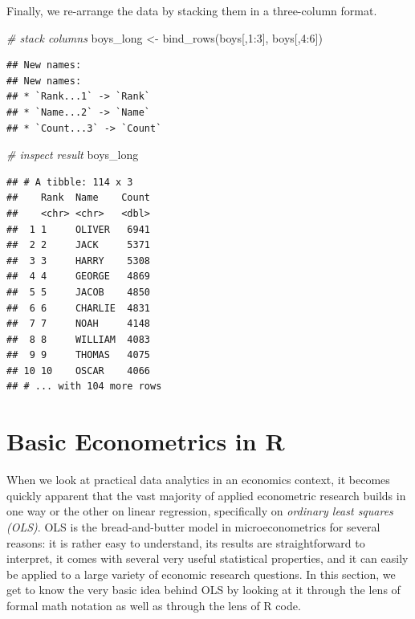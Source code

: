 \documentclass[
  12pt,
]{style/krantz}
\newenvironment{Shaded}{\begin{snugshade}}{\end{snugshade}}
\newcommand{\CommentTok}[1]{\textcolor[rgb]{0.56,0.35,0.01}{\textit{#1}}}
\newcommand{\DecValTok}[1]{\textcolor[rgb]{0.00,0.00,0.81}{#1}}
\newcommand{\FunctionTok}[1]{\textcolor[rgb]{0.00,0.00,0.00}{#1}}
\newcommand{\NormalTok}[1]{#1}
\newcommand{\OtherTok}[1]{\textcolor[rgb]{0.56,0.35,0.01}{#1}}
\newcommand{\SpecialCharTok}[1]{\textcolor[rgb]{0.00,0.00,0.00}{#1}}
\begin{document}
Finally, we re-arrange the data by stacking them in a three-column format.

\begin{Shaded}
\begin{Highlighting}[]
\CommentTok{\# stack columns}
\NormalTok{boys\_long }\OtherTok{\textless{}{-}} \FunctionTok{bind\_rows}\NormalTok{(boys[,}\DecValTok{1}\SpecialCharTok{:}\DecValTok{3}\NormalTok{], boys[,}\DecValTok{4}\SpecialCharTok{:}\DecValTok{6}\NormalTok{])}
\end{Highlighting}
\end{Shaded}

\begin{verbatim}
## New names:
## New names:
## * `Rank...1` -> `Rank`
## * `Name...2` -> `Name`
## * `Count...3` -> `Count`
\end{verbatim}

\begin{Shaded}
\begin{Highlighting}[]
\CommentTok{\# inspect result}
\NormalTok{boys\_long}
\end{Highlighting}
\end{Shaded}

\begin{verbatim}
## # A tibble: 114 x 3
##    Rank  Name    Count
##    <chr> <chr>   <dbl>
##  1 1     OLIVER   6941
##  2 2     JACK     5371
##  3 3     HARRY    5308
##  4 4     GEORGE   4869
##  5 5     JACOB    4850
##  6 6     CHARLIE  4831
##  7 7     NOAH     4148
##  8 8     WILLIAM  4083
##  9 9     THOMAS   4075
## 10 10    OSCAR    4066
## # ... with 104 more rows
\end{verbatim}

\hypertarget{basic-econometrics-in-r}{%
\chapter{Basic Econometrics in R}\label{basic-econometrics-in-r}}

When we look at practical data analytics in an economics context, it becomes quickly apparent that the vast majority of applied econometric research builds in one way or the other on linear regression, specifically on \emph{ordinary least squares (OLS)}. OLS is the bread-and-butter model in microeconometrics for several reasons: it is rather easy to understand, its results are straightforward to interpret, it comes with several very useful statistical properties, and it can easily be applied to a large variety of economic research questions. In this section, we get to know the very basic idea behind OLS by looking at it through the lens of formal math notation as well as through the lens of R code.
\end{document}
